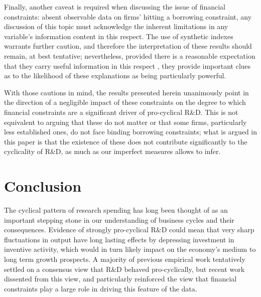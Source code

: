 \documentclass{_latex/house}
\begin{document}
Finally, another caveat is required when discussing the issue of financial constraints: absent observable data on firms' hitting a borrowing constraint, any discussion of this topic must acknowledge the inherent limitations in any variable's information content in this respect. The use of synthetic indexes warrants further caution, and therefore the interpretation of these results should remain, at best tentative; nevertheless, provided there is a reasonable expectation that they carry useful information in this respect , they provide important clues as to the likelihood of these explanations as being particularly powerful.

With those cautions in mind, the results presented herein unanimously point in the direction of a negligible impact of these constraints on the degree to which financial constraints are a significant driver of pro-cyclical R\&D. This is not equivalent to arguing that these do not matter or that some firms, particularly less established ones, do not face binding borrowing constraints; what is argued in this paper is that the existence of these does not contribute significantly to the cyclicality of R\&D, as much as our imperfect measures allows to infer.
\section{Conclusion} \label{conclusion}
The cyclical pattern of research spending has long been thought of as an important stepping stone in our understanding of business cycles and their consequences. Evidence of strongly pro-cyclical R\&D could mean that very sharp fluctuations in output have long lasting effects by depressing investment in inventive activity, which would in turn likely impact on the economy's medium to long term growth prospects. A majority of previous empirical work tentatively settled on a consensus view that R\&D behaved pro-cyclically, but recent work dissented from this view, and particularly reinforced the view that financial constraints play a large role in driving this feature of the data.
\end{document}
